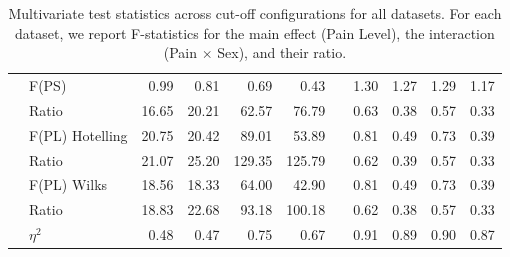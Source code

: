 \documentclass[preprint,12pt,authoryear]{elsarticle}
\begin{document}
\begin{table}[ht]
{\begin{tabular}{llrrrrlrrrr}
& F(PS)          & 0.99  & 0.81  & 0.69  & 0.43 & & 1.30 & 1.27 & 1.29 & 1.17 \\
& Ratio          & 16.65 & 20.21 & 62.57 & 76.79 & & 0.63 & 0.38 & 0.57 & 0.33 \\
& F(PL) Hotelling & 20.75 & 20.42 & 89.01 & 53.89 & & 0.81 & 0.49 & 0.73 & 0.39 \\
& Ratio          & 21.07 & 25.20 & 129.35 & 125.79 & & 0.62 & 0.39 & 0.57 & 0.33 \\
& F(PL) Wilks    & 18.56 & 18.33 & 64.00 & 42.90 & & 0.81 & 0.49 & 0.73 & 0.39 \\
& Ratio          & 18.83 & 22.68 & 93.18 & 100.18 & & 0.62 & 0.38 & 0.57 & 0.33 \\
& $\eta^2$       & 0.48 & 0.47 & 0.75 & 0.67 & & 0.91 & 0.89 & 0.90 & 0.87 \\
\bottomrule
\end{tabular}
}
\caption{Multivariate test statistics across cut-off configurations for all datasets. For each dataset, we report F-statistics for the main effect (Pain Level), the interaction (Pain $\times$ Sex), and their ratio.\label{tab:app_multivariate_all}}
\end{table}
\end{document}
